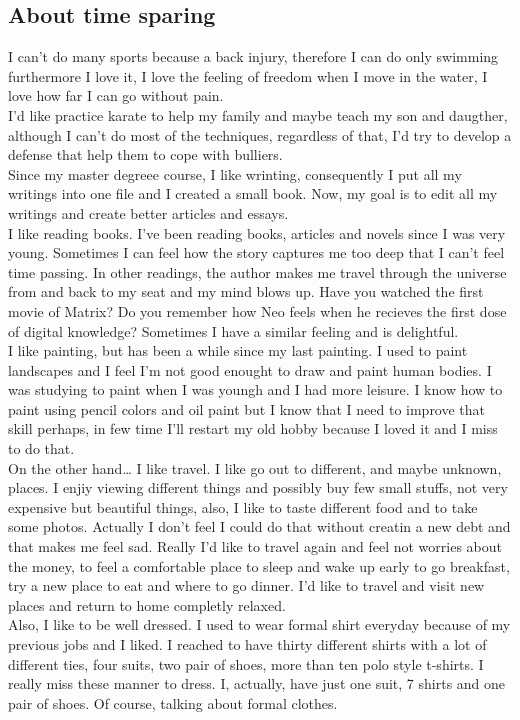 \subsection{About time sparing}
\begin{multicols}{2}
I can't do many sports because a back injury, therefore I can do only swimming furthermore I love it, I love the feeling of freedom when I move in the water, I love how far I can go without pain.\\
I'd like practice karate to help my family and maybe teach my son and daugther, although I can't do most of the techniques, regardless of that, I'd try to develop a defense that help them to cope with bulliers.\\
Since my master degreee course, I like wrinting, consequently I put all my writings into one file and I created a small book. Now, my goal is to edit all my writings and create better articles and essays.\\
I like reading books. I've been reading books, articles and novels since I was very young. Sometimes I can feel how the story captures me too deep that I can't feel time passing. In other readings, the author makes me travel through the universe from and back to my seat and my mind blows up. Have you watched the first movie of Matrix? Do you remember how Neo feels when he recieves the first dose of digital knowledge? Sometimes I have a similar feeling and is delightful.\\
I like painting, but has been a while since my last painting.
I used to paint landscapes and I feel I'm not good enought to draw and paint human bodies. I was studying to paint when I was youngh and I had more leisure. I know how to paint using pencil colors and oil paint but I know that I need to improve that skill perhaps, in few time I'll restart my old hobby because I loved it and I miss to do that.\\
On the other hand\dots
I like travel.
I like go out to different, and maybe unknown, places.
I enjiy viewing different things and possibly buy few small stuffs, not very expensive but beautiful things, also, I like to taste different food and to take some photos.
Actually I don't feel I could do that without creatin a new debt and that makes me feel sad. Really I'd like to travel again and feel not worries about the money, to feel a comfortable place to sleep and wake up early to go breakfast, try a new place to eat and where to go dinner. I'd like to travel and visit new places and return to home completly relaxed.\\
Also, I like to be well dressed. I used to wear formal shirt everyday because of my previous jobs and I liked. I reached to have thirty different shirts with a lot of different ties, four suits, two pair of shoes, more than ten polo style t-shirts.
I really miss these manner to dress. I, actually, have just one suit, 7 shirts and one pair of shoes. Of course, talking about formal clothes.\\


\end{multicols}

